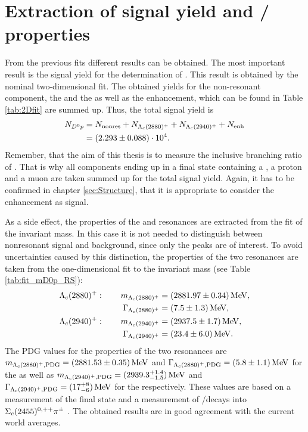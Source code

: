 \section{Extraction of \LbToDpmunuX signal yield and \LcResI / \LcResII properties}
\label{sec:Signalyield_D0p}
From the previous fits different results can be obtained. 
The most important result is the \LbToDpmunuX signal yield \NDp for the determination of \R.
This result is obtained by the nominal two-dimensional fit.
The obtained yields for the non-resonant component, the \LcResI and the \LcResII as well as the enhancement, which can be found in Table \ref{tab:2Dfit} are summed up.
Thus, the total \LbToDpmunuX signal yield is
\begin{align*}
    N_{{{D}^0}{p}} &= N_{\text{nonres}} + N_{{\Lambda}_{c}(2880)^+} + N_{{\Lambda}_{c}(2940)^+} + N_{\text{enh}} \\
         &= (2.293 \pm 0.088)\cdot 10^{4}. 
\end{align*}
Remember, that the aim of this thesis is to measure the inclusive branching ratio of \LbToDpmunuX.
That is why all components ending up in a final state containing a \Dz, a proton and a muon are taken summed up for the total signal yield.
Again, it has to be confirmed in chapter \ref{sec:Structure}, that it is appropriate to consider the enhancement as signal.

As a side effect, the properties of the \LcResI and \LcResII resonances are extracted from the fit of the invariant \Dz\proton mass.
In this case it is not needed to distinguish between nonresonant signal and background, since only the peaks are of interest. 
To avoid uncertainties caused by this distinction, the properties of the two resonances are taken from the one-dimensional fit to the invariant \Dz\proton mass (see Table \ref{tab:fit_mD0p_RS}):
\begin{align*}
    {\ensuremath{\Lambda}}_{c}(2880)^+: \qquad  m_{{\Lambda}_{c}(2880)^+}       &= (2881.97 \pm 0.34) \mathrm{\,Me\kern -0.1em V}, \\
                     \Gamma_{{\Lambda}_{c}(2880)^+}  &= (7.5 \pm 1.3) \mathrm{\,Me\kern -0.1em V}, \\
    {\Lambda}_{c}(2940)^+: \qquad m_{{\Lambda}_{c}(2940)^+}      &= (2937.5 \pm 1.7) \mathrm{\,Me\kern -0.1em V}, \\
                     \Gamma_{{\Lambda}_{c}(2940)^+} &= (23.4 \pm 6.0) \mathrm{\,Me\kern -0.1em V}.
\end{align*}
The PDG values for the properties of the two resonances are $m_{{\Lambda}_{c}(2880)^+, \text{PDG}} = (2881.53 \pm 0.35)\mathrm{\,Me\kern -0.1em V}$ and $\Gamma_{{\Lambda}_{c}(2880)^+, \text{PDG}} = (5.8 \pm 1.1)\mathrm{\,Me\kern -0.1em V}$ for the \LcResI as well as $m_{{\Lambda}_{c}(2940)^+, \text{PDG}} = (2939.3^{+1.4}_{-1.5})\mathrm{\,Me\kern -0.1em V}$ and $\Gamma_{{\Lambda}_{c}(2940)^+, \text{PDG}} = (17^{+8}_{-6})\mathrm{\,Me\kern -0.1em V}$ for the \LcResII respectively.
These values are based on a \babar measurement of the \Dz\proton final state and a \belle measurement of \LcResI/\LcResII decays into $\Sigma_{c}(2455)^{0,++}{{\pi}^\pm}$ \cite{Belle_LcRes}.
The obtained results are in good agreement with the current world averages.

